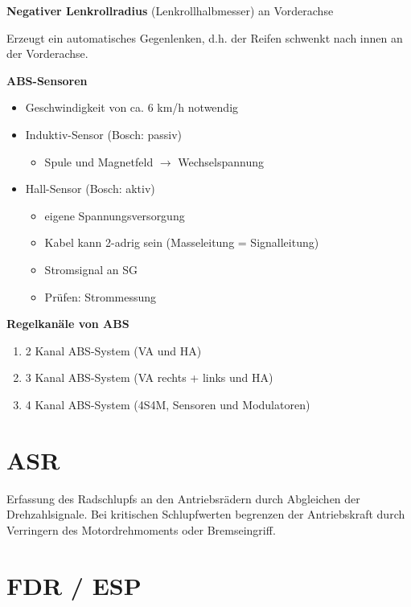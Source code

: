 \textbf{Negativer Lenkrollradius} (Lenkrollhalbmesser) an Vorderachse

Erzeugt ein automatisches Gegenlenken, d.h. der Reifen schwenkt nach
innen an der Vorderachse.

\textbf{ABS-Sensoren}

\begin{itemize}
\item
  Geschwindigkeit von ca. 6 km/h notwendig
\item
  Induktiv-Sensor (Bosch: passiv)

  \begin{itemize}
  \item
    Spule und Magnetfeld $\to$ Wechselspannung
  \end{itemize}
\item
  Hall-Sensor (Bosch: aktiv)

  \begin{itemize}
  \item
    eigene Spannungsversorgung
  \item
    Kabel kann 2-adrig sein (Masseleitung = Signalleitung)
  \item
    Stromsignal an SG
  \item
    Prüfen: Strommessung
  \end{itemize}
\end{itemize}

\textbf{Regelkanäle von ABS}

\begin{enumerate}
\item
  2 Kanal ABS-System (VA und HA)
\item
  3 Kanal ABS-System (VA rechts + links und HA)
\item
  4 Kanal ABS-System (4S4M, Sensoren und Modulatoren)
\end{enumerate}

\section{ASR}\label{asr}

Erfassung des Radschlupfs an den Antriebsrädern durch Abgleichen der
Drehzahlsignale. Bei kritischen Schlupfwerten begrenzen der
Antriebskraft durch Verringern des Motordrehmoments oder Bremseingriff.

\section{FDR / ESP}\label{fdr-esp}

